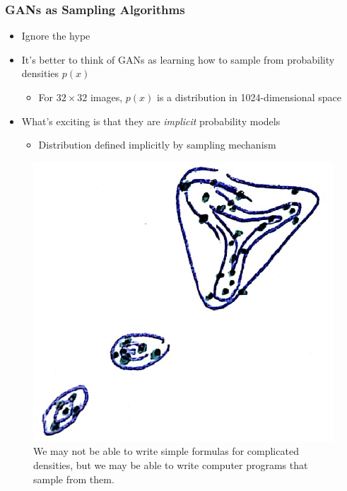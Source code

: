 \documentclass[10pt,mathserif]{beamer}
\begin{document}
\begin{frame}
  \frametitle{GANs as Sampling Algorithms}
  \begin{itemize}
  \item Ignore the hype
  \item It's better to think of GANs as learning how to sample from probability
    densities $p\left(x\right)$
    \begin{itemize}
    \item For $32 \times 32$ images, $p\left(x\right)$ is a distribution in
      1024-dimensional space
    \end{itemize}
  \item What's exciting is that they are \textit{implicit} probability models
    \begin{itemize}
    \item Distribution defined implicitly by sampling mechanism
    \end{itemize} 
  \end{itemize}
  \begin{figure}[ht]
    \centering
    \includegraphics[width=0.3\paperwidth]{figure/gan_density}
    \caption{We may not be able to write simple formulas for complicated
      densities, but we may be able to write computer programs that sample from
      them.\label{fig:gan_density} }
  \end{figure}
\end{frame}
\end{document}
